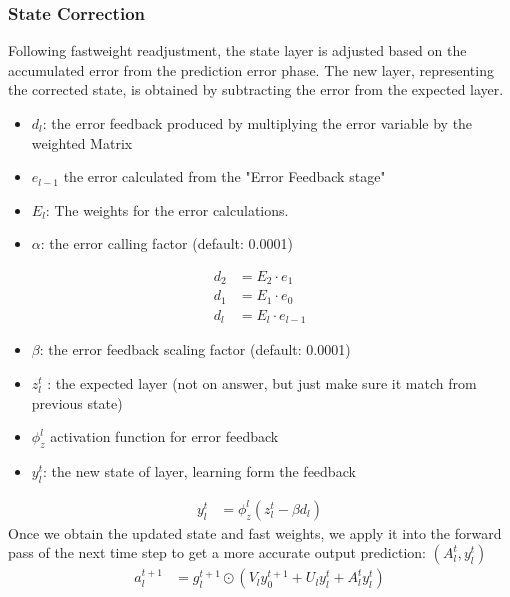 \documentclass{article}
\begin{document}
\subsubsection{State Correction} %
Following fastweight readjustment, the state layer is adjusted based on the accumulated error from the prediction error phase. The new layer, representing the corrected state, is obtained by subtracting the error from the expected layer.
\begin{itemize}
    \item $d_l$: the error feedback produced by multiplying the error variable by the weighted Matrix
    \item $e_{l-1}$ the error calculated from the "Error Feedback stage"
    \item $E_l$: The weights for the error calculations.
    \item $\alpha$: the error calling factor (default: 0.0001)
\end{itemize}
\begin{align}
d_2 &= E_2 \cdot e_1 \\
d_1 &= E_1 \cdot e_0\\ %
d_l &= E_l \cdot e_{l-1}
\end{align}
\begin{itemize}
    \item $\beta$: the error feedback scaling factor (default: 0.0001)
    \item $z^t_l$ : the expected layer (not on answer, but just make sure it match from previous state) %
    \item $\phi^l_z$ activation function for error feedback
    \item $y_l^{t}$: the new state of layer, learning form the feedback
\end{itemize}
\begin{align}
y_l^{t} &= \phi^l_z(z^t_l - \beta d_l)
\end{align}
Once we obtain the updated state and fast weights, we apply it into the forward pass of the next time step to get a more accurate output prediction:  \begin{math}( A_l^t, y_l^{t}) \end{math}
\begin{align}
a_l^{t+1} &= g_l^{t+1} \odot \left(V_l y_0^{t+1} + U_l y_l^{t} + A_l^t y_l^{t} \right)
\end{align}
\end{document}
